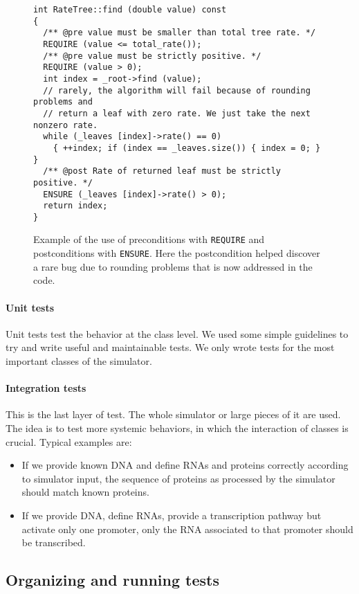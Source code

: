 \begin{figure}[!h]
  \centering
\begin{verbatim}
int RateTree::find (double value) const
{
  /** @pre value must be smaller than total tree rate. */
  REQUIRE (value <= total_rate());
  /** @pre value must be strictly positive. */
  REQUIRE (value > 0);
  int index = _root->find (value);
  // rarely, the algorithm will fail because of rounding problems and
  // return a leaf with zero rate. We just take the next nonzero rate.
  while (_leaves [index]->rate() == 0)
    { ++index; if (index == _leaves.size()) { index = 0; } }
  /** @post Rate of returned leaf must be strictly positive. */
  ENSURE (_leaves [index]->rate() > 0);
  return index;
}
\end{verbatim}
\caption{Example of the use of preconditions with \texttt{REQUIRE} and postconditions with \texttt{ENSURE}.
Here the postcondition helped discover a rare bug due to rounding problems that is now addressed in the code.}
\label{fig:prepostconditions}
\end{figure}

\paragraph{Unit tests}
Unit tests test the behavior at the class level.
We used some simple guidelines to try and write useful and maintainable tests.
We only wrote tests for the most important classes of the simulator.

\paragraph{Integration tests}
This is the last layer of test.
The whole simulator or large pieces of it are used.
The idea is to test more systemic behaviors, in which the interaction of classes is crucial.
Typical examples are:
\begin{itemize}
  \item If we provide known DNA and define RNAs and proteins correctly according to simulator input,
  the sequence of proteins as processed by the simulator should match known proteins.
  \item If we provide DNA, define RNAs, provide a transcription pathway but activate only one promoter,
  only the RNA associated to that promoter should be transcribed.
\end{itemize}


\subsection{Organizing and running tests}

